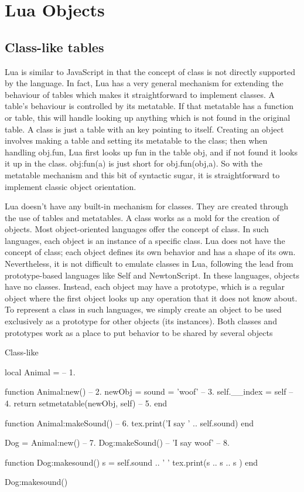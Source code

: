 \chapter{Lua Objects}
\label{c:luaobjects}

\section{Class-like tables}
Lua is similar to JavaScript in that the concept of class is not directly supported by the language. In fact, Lua has a very general mechanism for extending the behaviour of tables which makes it straightforward to implement classes. A table’s behaviour is controlled by its metatable. If that metatable has a  function or table, this will handle looking up anything which is not found in the original table. A class is just a table with an  key pointing to itself. Creating an object involves making a table and setting its metatable to the class; then when handling obj.fun, Lua first looks up fun in the table obj, and if not found it looks it up in the class. obj:fun(a) is just short for obj.fun(obj,a). So with the metatable mechanism and this bit of syntactic sugar, it is straightforward to implement classic object orientation.

Lua doesn't have any built-in mechanism for classes. They are created through the use of tables
and metatables. A class works as a mold for the creation of objects. Most object-oriented languages
offer the concept of class. In such languages, each object is an instance
of a specific class. Lua does not have the concept of class; each object defines
its own behavior and has a shape of its own. Nevertheless, it is not difficult to
emulate classes in Lua, following the lead from prototype-based languages like
Self and NewtonScript. In these languages, objects have no classes. Instead,
each object may have a prototype, which is a regular object where the first object
looks up any operation that it does not know about. To represent a class in
such languages, we simply create an object to be used exclusively as a prototype
for other objects (its instances). Both classes and prototypes work as a place to
put behavior to be shared by several objects
\begin{texexample}{Class-like}{}
\begin{luacode}
local Animal = {}                                  -- 1. 

function Animal:new()                         -- 2.
  newObj = {sound = 'woof'}               -- 3.
  self.__index = self                      -- 4.
  return setmetatable(newObj, self)     -- 5.
end

function Animal:makeSound()             -- 6.
  tex.print('I say ' .. self.sound)
end

Dog = Animal:new()                            -- 7.
Dog:makeSound()  -- 'I say woof'         -- 8.

function Dog:makesound()
  s = self.sound .. ' '
  tex.print(s .. s .. s )
end

Dog:makesound()
  
\end{luacode}
\end{texexample}

